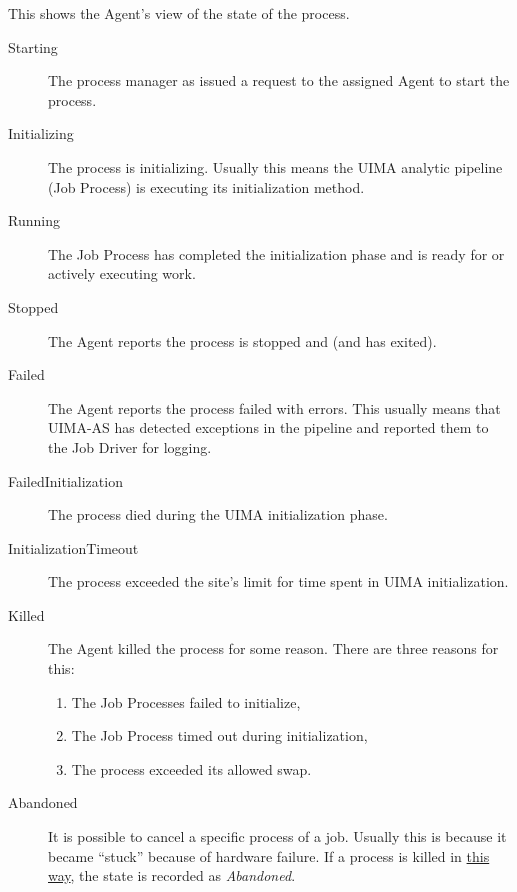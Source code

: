 \begin{description}
            This shows the {\DUCC} Agent's view of the state of the process.
            \begin{description}
               \item[Starting] The {\DUCC} process manager as issued a request to the assigned {\DUCC} Agent to
                 start the process.
               \item[Initializing] The process is initializing.  Usually this means the UIMA analytic
                 pipeline (Job Process) is executing its initialization method.
              \item[Running] The Job Process has completed the initialization phase and is ready for 
                or actively executing work.
              \item[Stopped] The {\DUCC} Agent reports the process is stopped and (and has exited).
              \item[Failed] The {\DUCC} Agent reports the process failed with errors.  This usually
                means that UIMA-AS has detected exceptions in the pipeline and reported them
                to the Job Driver for logging.
              \item[FailedInitialization] The process died during the UIMA initialization phase.
              \item[InitializationTimeout] The process exceeded the site's limit for time spent
                in UIMA initialization.
              \item[Killed] The {\DUCC} Agent killed the process for some reason.  There are
                three reasons for this:
                \begin{enumerate}
                  \item The Job Processes failed to initialize,
                  \item The Job Process timed out during initialization,
                  \item The process exceeded its allowed swap.
                \end{enumerate}
              \item[Abandoned] It is possible to cancel a specific process of a job.  Usually
                this is because it became ``stuck'' because of hardware failure.  If a process
                is killed in \hyperref[sec:cli.ducc-cancel]{this way}, the state is recorded as {\em Abandoned}.
            \end{description}
            

\end{description}
